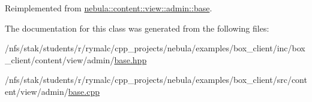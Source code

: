 Reimplemented from \hyperlink{classnebula_1_1content_1_1view_1_1admin_1_1base_a8226e4b40dd4752b5b88f868ac6185ca}{nebula::content::view::admin::base}.

The documentation for this class was generated from the following files:\begin{DoxyCompactItemize}
\item 
/nfs/stak/students/r/rymalc/cpp\_\-projects/nebula/examples/box\_\-client/inc/box\_\-client/content/view/admin/\hyperlink{examples_2box__client_2inc_2box__client_2content_2view_2admin_2base_8hpp}{base.hpp}\item 
/nfs/stak/students/r/rymalc/cpp\_\-projects/nebula/examples/box\_\-client/src/content/view/admin/\hyperlink{examples_2box__client_2src_2content_2view_2admin_2base_8cpp}{base.cpp}\end{DoxyCompactItemize}
